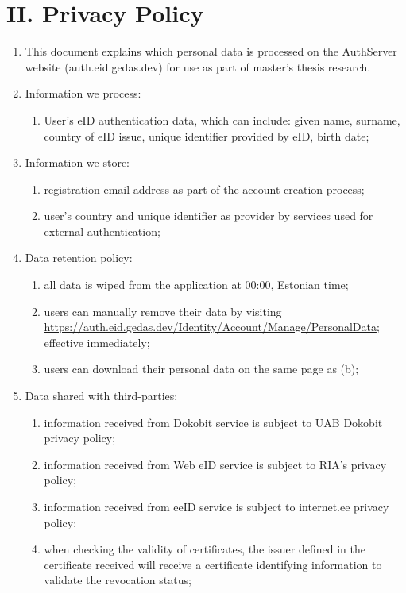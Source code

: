 \section*{II. Privacy Policy}
\label{appendix:privacy}

\begin{enumerate}
    \item This document explains which personal data is processed on the AuthServer website (auth.eid.gedas.dev) for use as part of master's thesis research.
    \item Information we process:
    \begin{enumerate}
        \item User's eID authentication data, which can include: given name, surname, country of eID issue, unique identifier provided by eID, birth date;
    \end{enumerate}
    \item Information we store:
    \begin{enumerate}
        \item registration email address as part of the account creation process;
        \item user's country and unique identifier as provider by services used for external authentication;
    \end{enumerate}
    \item Data retention policy:
    \begin{enumerate}
        \item all data is wiped from the application at 00:00, Estonian time;
        \item users can manually remove their data by visiting \url{https://auth.eid.gedas.dev/Identity/Account/Manage/PersonalData}; effective immediately;
        \item users can download their personal data on the same page as (b);
    \end{enumerate}
    \item Data shared with third-parties:
    \begin{enumerate}
        \item information received from Dokobit service is subject to UAB Dokobit privacy policy;
        \item information received from Web eID service is subject to RIA's privacy policy;
        \item information received from eeID service is subject to internet.ee privacy policy;
        \item when checking the validity of certificates, the issuer defined in the certificate received will receive a certificate identifying information to validate the revocation status;
    \end{enumerate}
\end{enumerate}
